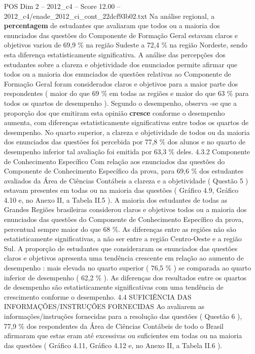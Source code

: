 \begin{textsample}{POS Dim 2 – 2012\_c4 – Score 12.00 – 2012\_c4/enade\_2012\_ci\_cont\_22dcf93b02.txt}
Na análise regional, a \textbf{percentagem} de estudantes que avaliaram que todos ou a maioria dos enunciados das questões do Componente de Formação Geral estavam claros e objetivos variou de 69,9 \% na região Sudeste a 72,4 \% na região Nordeste, sendo esta diferença estatisticamente significativa.
A análise das percepções dos estudantes sobre a clareza e objetividade dos enunciados permite afirmar que todos ou a maioria dos enunciados de questões relativas ao Componente de Formação Geral foram considerados claros e objetivos para a maior parte dos respondentes ( maior do que 69 \% em todas as regiões e maior do que 63 \% para todos os quartos de desempenho ).
Segundo o desempenho, observa -se que a proporção dos que emitiram esta opinião \textbf{cresce} conforme o desempenho aumenta, com diferenças estatisticamente significativas entre todos os quartos de desempenho.
No quarto superior, a clareza e objetividade de todos ou da maioria dos enunciados das questões foi percebida por 77,8 \% dos alunos e no quarto de desempenho inferior tal avaliação foi emitida por 63,3 \% deles. 4.3.2 Componente de Conhecimento Específico Com relação aos enunciados das questões do Componente de Conhecimento Específico da prova, para 69,6 \% dos estudantes avaliados da Área de Ciências Contábeis a clareza e a objetividade ( Questão 5 ) estavam presentes em todas ou na maioria das questões ( Gráfico 4.9, Gráfico 4.10 e, no Anexo II, a Tabela II.5 ).
A maioria dos estudantes de todas as Grandes Regiões brasileiras considerou claros e objetivos todos ou a maioria dos enunciados das questões do Componente de Conhecimento Específico da prova, percentual sempre maior do que 68 \%.
As diferenças entre as regiões não são estatisticamente significativas, a não ser entre a região Centro-Oeste e a região Sul.
A proporção de estudantes que consideraram os enunciados das questões claros e objetivos apresenta uma tendência crescente em relação ao aumento de desempenho : mais elevada no quarto superior ( 76,5 \% ) se comparada ao quarto inferior de desempenho ( 62,2 \% ).
As diferenças dos resultados entre os quartos de desempenho são estatisticamente significativas com uma tendência de crescimento conforme o desempenho. 4.4 SUFICIÊNCIA DAS INFORMAÇÕES/INSTRUÇÕES FORNECIDAS Ao avaliarem as informações/instruções fornecidas para a resolução das questões ( Questão 6 ), 77,9 \% dos respondentes da Área de Ciências Contábeis de todo o Brasil afirmaram que estas eram até excessivas ou suficientes em todas ou na maioria das questões ( Gráfico 4.11, Gráfico 4.12 e, no Anexo II, a Tabela II.6 ).

\end{textsample}
